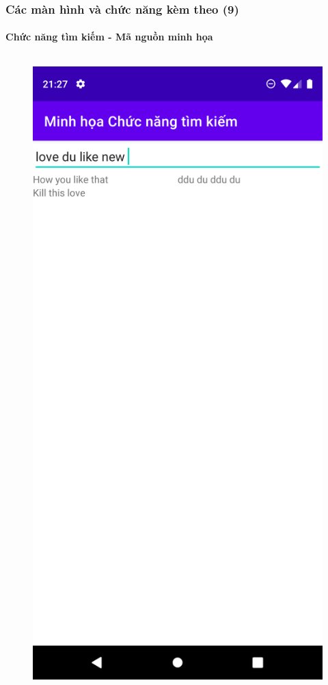 \documentclass{beamer}
\begin{document}
\begin{frame}
    \frametitle{Các màn hình và chức năng kèm theo (9)}
    \framesubtitle{Chức năng tìm kiếm - Mã nguồn minh họa}

    \begin{columns}
        \begin{figure}
            \centering
            \includegraphics[height=0.7\textheight]{images/40.png}

\end{figure}
\end{columns}
\end{frame}
\end{document}
